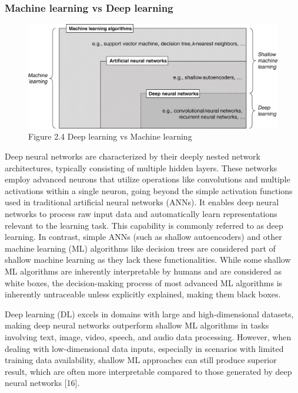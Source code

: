 \subsubsection{Machine learning vs Deep learning}

\begin{center}
    \begin{figure}[!htp]
        \centering
        \includegraphics[width=0.8 \textwidth]{image/dnn_vs_ml.jpeg}
        \caption{Figure 2.4 Deep learning vs Machine learning}
        \label{subsection}
    \end{figure}
    \end{center}

Deep neural networks are characterized by their deeply nested network architectures, typically consisting of multiple hidden layers. These networks employ advanced neurons that utilize operations like convolutions and multiple activations within a single neuron, going beyond the simple activation functions used in traditional artificial neural networks (ANNs). 
It enables deep neural networks to process raw input data and automatically learn representations relevant to the learning task. This capability is commonly referred to as deep learning. In contrast, simple ANNs (such as shallow autoencoders) and other machine learning (ML) algorithms like decision trees are considered part of shallow machine learning as they lack these functionalities. 
While some shallow ML algorithms are inherently interpretable by humans and are considered as white boxes, the decision-making process of most advanced ML algorithms is inherently untraceable unless explicitly explained, making them black boxes.

Deep learning (DL) excels in domains with large and high-dimensional datasets, making deep neural networks outperform shallow ML algorithms in tasks involving text, image, video, speech, and audio data processing. 
However, when dealing with low-dimensional data inputs, especially in scenarios with limited training data availability, shallow ML approaches can still produce superior result, 
which are often more interpretable compared to those generated by deep neural networks [16]. 

